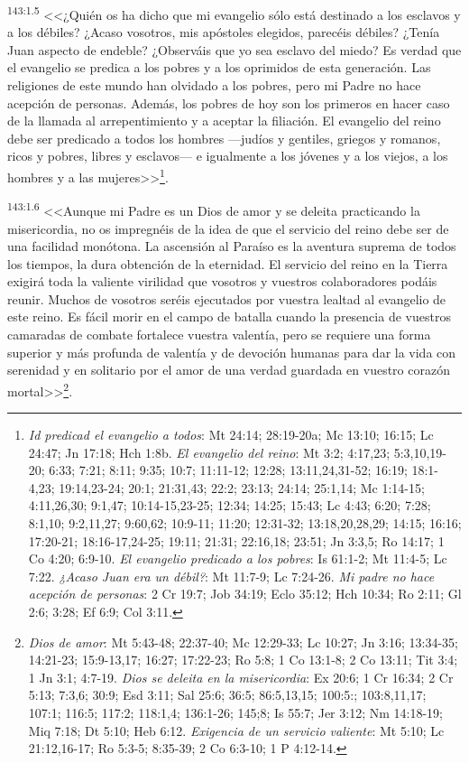 \par 
\textsuperscript{143:1.5} <<¿Quién os ha dicho que mi evangelio sólo está destinado a los esclavos y a los débiles? ¿Acaso vosotros, mis apóstoles elegidos, parecéis débiles? ¿Tenía Juan aspecto de endeble? ¿Observáis que yo sea esclavo del miedo? Es verdad que el evangelio se predica a los pobres y a los oprimidos de esta generación. Las religiones de este mundo han olvidado a los pobres, pero mi Padre no hace acepción de personas. Además, los pobres de hoy son los primeros en hacer caso de la llamada al arrepentimiento y a aceptar la filiación. El evangelio del reino debe ser predicado a todos los hombres ---judíos y gentiles, griegos y romanos, ricos y pobres, libres y esclavos--- e igualmente a los jóvenes y a los viejos, a los hombres y a las mujeres>>\footnote{\textit{Id predicad el evangelio a todos}: Mt 24:14; 28:19-20a; Mc 13:10; 16:15; Lc 24:47; Jn 17:18; Hch 1:8b. \textit{El evangelio del reino}: Mt 3:2; 4:17,23; 5:3,10,19-20; 6:33; 7:21; 8:11; 9:35; 10:7; 11:11-12; 12:28; 13:11,24,31-52; 16:19; 18:1-4,23; 19:14,23-24; 20:1; 21:31,43; 22:2; 23:13; 24:14; 25:1,14; Mc 1:14-15; 4:11,26,30; 9:1,47; 10:14-15,23-25; 12:34; 14:25; 15:43; Lc 4:43; 6:20; 7:28; 8:1,10; 9:2,11,27; 9:60,62; 10:9-11; 11:20; 12:31-32; 13:18,20,28,29; 14:15; 16:16; 17:20-21; 18:16-17,24-25; 19:11; 21:31; 22:16,18; 23:51; Jn 3:3,5; Ro 14:17; 1 Co 4:20; 6:9-10. \textit{El evangelio predicado a los pobres}: Is 61:1-2; Mt 11:4-5; Lc 7:22. \textit{¿Acaso Juan era un débil?}: Mt 11:7-9; Lc 7:24-26. \textit{Mi padre no hace acepción de personas}: 2 Cr 19:7; Job 34:19; Eclo 35:12; Hch 10:34; Ro 2:11; Gl 2:6; 3:28; Ef 6:9; Col 3:11.}.

\par 
\textsuperscript{143:1.6} <<Aunque mi Padre es un Dios de amor y se deleita practicando la misericordia, no os impregnéis de la idea de que el servicio del reino debe ser de una facilidad monótona. La ascensión al Paraíso es la aventura suprema de todos los tiempos, la dura obtención de la eternidad. El servicio del reino en la Tierra exigirá toda la valiente virilidad que vosotros y vuestros colaboradores podáis reunir. Muchos de vosotros seréis ejecutados por vuestra lealtad al evangelio de este reino. Es fácil morir en el campo de batalla cuando la presencia de vuestros camaradas de combate fortalece vuestra valentía, pero se requiere una forma superior y más profunda de valentía y de devoción humanas para dar la vida con serenidad y en solitario por el amor de una verdad guardada en vuestro corazón mortal>>\footnote{\textit{Dios de amor}: Mt 5:43-48; 22:37-40; Mc 12:29-33; Lc 10:27; Jn 3:16; 13:34-35; 14:21-23; 15:9-13,17; 16:27; 17:22-23; Ro 5:8; 1 Co 13:1-8; 2 Co 13:11; Tit 3:4; 1 Jn 3:1; 4:7-19. \textit{Dios se deleita en la misericordia}: Ex 20:6; 1 Cr 16:34; 2 Cr 5:13; 7:3,6; 30:9; Esd 3:11; Sal 25:6; 36:5; 86:5,13,15; 100:5:; 103:8,11,17; 107:1; 116:5; 117:2; 118:1,4; 136:1-26; 145;8; Is 55:7; Jer 3:12; Nm 14:18-19; Miq 7:18; Dt 5:10; Heb 6:12. \textit{Exigencia de un servicio valiente}: Mt 5:10; Lc 21:12,16-17; Ro 5:3-5; 8:35-39; 2 Co 6:3-10; 1 P 4:12-14.}.


